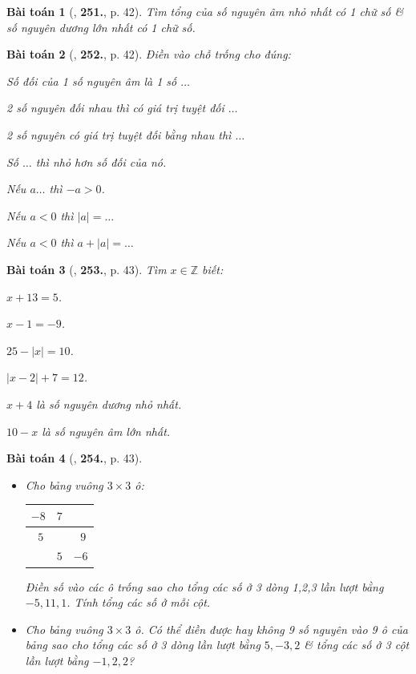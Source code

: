 \documentclass{article}
\numberwithin{equation}{section}
\newtheorem{baitoan}{Bài toán}
\begin{document}
\begin{baitoan}[\cite{Binh_Toan_6_tap_1}, \textbf{251.}, p. 42]
	Tìm tổng của số nguyên âm nhỏ nhất có 1 chữ số \& số nguyên dương lớn nhất có 1 chữ số.
\end{baitoan}

\begin{baitoan}[\cite{Binh_Toan_6_tap_1}, \textbf{252.}, p. 42]
	Điền vào chỗ trống cho đúng:
	\begin{enumerate*}
		\item[(a)] Số đối của 1 số nguyên âm là 1 số $\ldots$
		\item[(b)] 2 số nguyên đối nhau thì có giá trị tuyệt đối $\ldots$
		\item[(c)] 2 số nguyên có giá trị tuyệt đối bằng nhau thì $\ldots$
		\item[(d)] Số $\ldots$ thì nhỏ hơn số đối của nó.
		\item[(e)] Nếu $a\ldots$ thì $-a > 0$.
		\item[(f)] Nếu $a < 0$ thì $|a| = \ldots$
		\item[(g)] Nếu $a < 0$ thì $a + |a| = \ldots$
	\end{enumerate*}
\end{baitoan}

\begin{baitoan}[\cite{Binh_Toan_6_tap_1}, \textbf{253.}, p. 43]
	Tìm $x\in\mathbb{Z}$ biết:
	\begin{enumerate*}
		\item[(a)] $x + 13 = 5$.
		\item[(b)] $x - 1 = -9$.
		\item[(c)] $25 - |x| = 10$.
		\item[(d)] $|x - 2| + 7 = 12$.
		\item[(e)] $x + 4$ là số nguyên dương nhỏ nhất.
		\item[(f)] $10 - x$ là số nguyên âm lớn nhất.
	\end{enumerate*}
\end{baitoan}

\begin{baitoan}[\cite{Binh_Toan_6_tap_1}, \textbf{254.}, p. 43]
	\begin{itemize}
		\item[(a)] Cho bảng vuông $3\times 3$ ô:
		\begin{table}[H]
			\centering
			\begin{tabular}{|c|c|c|}
				\hline
				$-8$ & $7$ &  \\
				\hline
				$\ \ 5$ &  & $\ \ 9$ \\
				\hline
				& $5$ & $-6$ \\
				\hline
			\end{tabular}
		\end{table}
		Điền số vào các ô trống sao cho tổng các số ở 3 dòng 1,2,3 lần lượt bằng $-5,11,1$. Tính tổng các số ở mỗi cột.
		\item[(b)] Cho bảng vuông $3\times 3$ ô. Có thể điền được hay không 9 số nguyên vào 9 ô của bảng sao cho tổng các số ở 3 dòng lần lượt bằng $5,-3,2$ \& tổng các số ở 3 cột lần lượt bằng $-1,2,2$?
	\end{itemize}
\end{baitoan}
\end{document}
